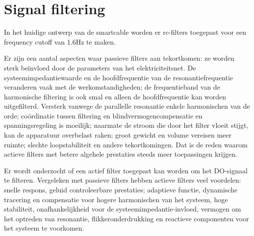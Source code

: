 \section{Signal filtering}

In het huidige ontwerp van de smartcable worden er rc-filters toegepast voor een frequency cutoff van 1.6Hz te maken.

Er zijn een aantal aspecten waar passieve filters aan tekortkomen: ze worden sterk beïnvloed door de parameters van het elektriciteitsnet. De systeemimpedantiewaarde en de hoofdfrequentie van de resonantiefrequentie veranderen vaak met de werkomstandigheden; de frequentieband van de harmonische filtering is ook smal en alleen de hoofdfrequentie kan worden uitgefilterd. Versterk vanwege de parallelle resonantie enkele harmonischen van de orde; coördinatie tussen filtering en blindvermogencompensatie en spanningsregeling is moeilijk; naarmate de stroom die door het filter vloeit stijgt, kan de apparatuur overbelast raken; groot gewicht en volume vereisen meer ruimte; slechte loopstabiliteit en andere tekortkomingen. Dat is de reden waarom actieve filters met betere algehele prestaties steeds meer toepassingen krijgen.


Er wordt onderzocht of een actief filter toegepast kan worden om het DO-signaal te filteren. 
Vergeleken met passieve filters hebben actieve filters veel voordelen: snelle respons, geluid controleerbare prestaties; adaptieve functie, dynamische tracering en compensatie voor hogere harmonischen van het systeem, hoge stabiliteit, onafhankelijkheid voor de systeemimpedantie-invloed, vermogen om het optreden van resonantie, flikkeronderdrukking en reactieve componenten voor het systeem te voorkomen.


